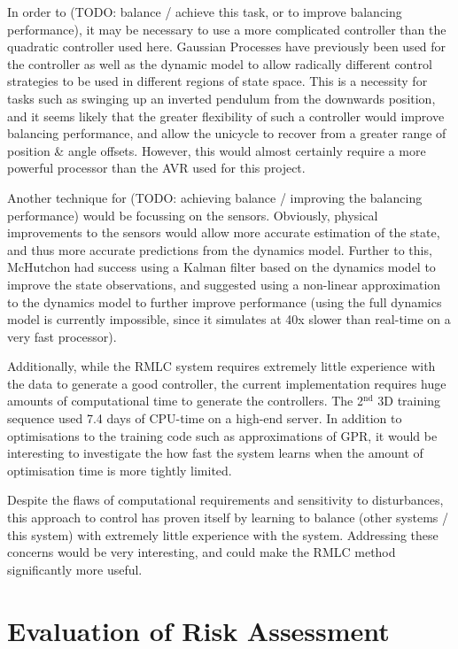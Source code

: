 \documentclass{IIBproject}
\begin{document}
In order to (TODO: balance / achieve this task, or to improve balancing
performance), it may be necessary to use a more complicated controller than the
quadratic controller used here. Gaussian Processes have previously been used
for the controller as well as the dynamic model to allow radically different
control strategies to be used in different regions of state space. This is a
necessity for tasks such as swinging up an inverted pendulum from the
downwards position, and it seems likely that the greater flexibility of such a
controller would improve balancing performance, and allow the unicycle to
recover from a greater range of position \& angle offsets. However, this would
almost certainly require a more powerful processor than the AVR used for this
project.

Another technique for (TODO: achieving balance / improving the balancing
performance) would be focussing on the sensors. Obviously, physical
improvements to the sensors would allow more accurate estimation of the state,
and thus more accurate predictions from the dynamics model. Further to this,
McHutchon had success using a Kalman filter based on the dynamics model to
improve the state observations, and suggested using a non-linear approximation
to the dynamics model to further improve performance (using the full dynamics
model is currently impossible, since it simulates at 40x slower than real-time
on a very fast processor).

Additionally, while the RMLC system requires extremely little experience with
the data to generate a good controller, the current implementation requires
huge amounts of computational time to generate the controllers. The
2$^\textrm{nd}$ 3D training sequence used 7.4 days of CPU-time on a high-end
server. In addition to optimisations to the training code such as
approximations of GPR, it would be interesting to investigate the how fast the
system learns when the amount of optimisation time is more tightly limited.

Despite the flaws of computational requirements and sensitivity to
disturbances, this approach to control has proven itself by learning to
balance (other systems / this system) with extremely little experience with
the system. Addressing these concerns would be very interesting, and could
make the RMLC method significantly more useful.




\pagebreak
\appendix

\section{Evaluation of Risk Assessment}
\end{document}
